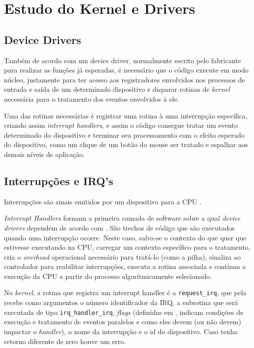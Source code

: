 \documentclass[
	12pt,			
	openright,			%
	twoside,			%
	a4paper,			%
	english,			%
	brazil,				%
	]{abntex2}
\begin{document}
\chapter{Estudo do Kernel e Drivers}

\section{Device Drivers}

Também de acordo com \textcite{TanenbaumBos14} um device driver, normalmente escrito pelo
fabricante para realizar as funções já esperadas, é necessário que o código
execute em modo núcleo, justamente para ter acesso aos registradores envolvidos
nos processos de entrada e saída de um determinado dispositivo e disparar
rotinas de \emph{kernel} necessária para o tratamento dos eventos envolvidos à
ele.

Uma das rotinas necessárias é registrar uma rotina à uma interrupção específica,
criando assim \emph{interrupt handlers}, e assim o código consegue tratar um
evento determinado do dispositivo e terminar seu processamento com o efeito
esperado do dispositivo, como um clique de um botão do mouse ser tratado e
espalhar aos demais níveis de aplicação.

\section{Interrupções e IRQ's}

Interrupções são sinais emitidos por um dispositivo para a CPU
\cite{interruptsOSDevWiki}.

\emph{Interrupt Handlers} formam a primeira camada de software sobre a qual
\emph{device drivers} dependem de acordo com \cite{TanenbaumBos14}. São trechos
de código que são executados quando uma interrupção ocorre. Neste caso, salva-se
o contexto do que quer que estivesse executando na CPU, carregar um contexto
específico para o tratamento, cria o \emph{overhead} operacional necessário para
tratá-lo (como a pilha), sinaliza ao controlador para reabilitar interrupções,
executa a rotina associada e continua a execução da CPU a partir do processo
algoritmicamente selecionado.

No \emph{kernel}, a rotina que registra um interrupt handler é a
\lstinline{request_irq}, que pela \cite{LinuxDocsLinuxGenericIRQHandling}
recebe como argumentos o número identificador da IRQ, a subrotina que será
executada de tipo \lstinline{irq_handler_irq}, \emph{flags} (definidas em
\cite{interruptHSourceCode}, indicam condições de execução e tratamento de
eventos paralelos e como eles devem (ou não devem) impactar o \emph{handler}), o
nome da interrupção e o id do dispositivo. Caso tenha retorno diferente de zero
houve um erro.
\end{document}
